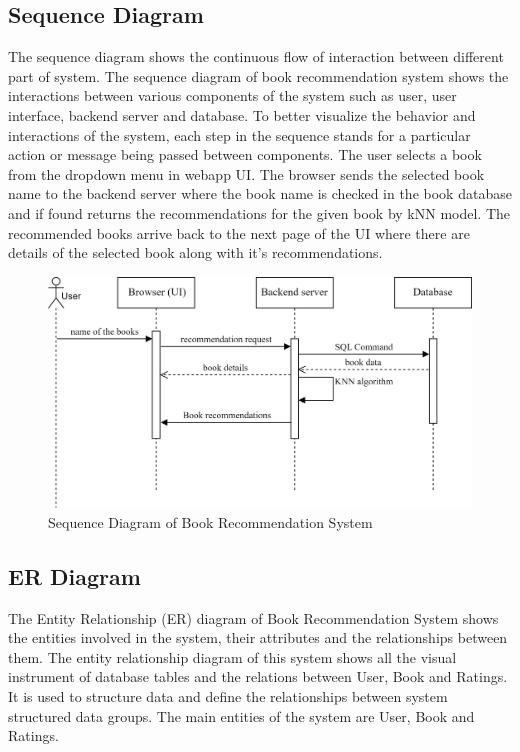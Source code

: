 \subsection{Sequence Diagram}
The sequence diagram shows the continuous flow of interaction between different part of system. The sequence diagram of book recommendation system shows the interactions between various components of the system such as user, user interface, backend server and database. To better visualize the behavior and interactions of the system, each step in the sequence stands for a particular action or message being passed between components. The user selects a book from the dropdown menu in webapp UI. The browser sends the selected book name to the backend server where the book name is checked in the book database and if found returns the recommendations for the given book by kNN model. The recommended books arrive back to the next page of the UI where there are details of the selected book along with it's recommendations. 
\begin{figure}[h]
    \centering
    \includegraphics[width=1\linewidth]{img/Graphics/BRS_sequence.png}
    \caption{Sequence Diagram of Book Recommendation System }
    \label{Sequence}
\end{figure}

\subsection{ER Diagram}
The Entity Relationship (ER) diagram of Book Recommendation System shows the entities involved in the system, their attributes and the relationships between them. The entity relationship diagram of this system shows all the visual instrument of database tables and the relations between User, Book and Ratings. It is used to structure data and define the relationships between system structured data groups. The main entities of the system are User, Book and Ratings.

